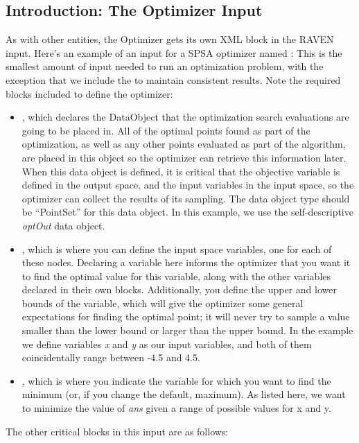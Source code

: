 \subsection{Introduction: The Optimizer Input}
As with other entities, the Optimizer gets its own XML block in the RAVEN input.
Here's an example of an input for a SPSA optimizer named :
This is the smallest amount of input needed to run an optimization problem, with the exception that we include
the  to maintain consistent results.  Note the required blocks included
to define the optimizer:
\begin{itemize}
  \item {}, which declares the DataObject that the optimization search evaluations are
    going to be placed in.  All of the optimal points found as part of the optimization, as well as any other
    points evaluated as part of the algorithm, are placed in this object so the optimizer can retrieve this
    information later.  When this data object is defined, it is critical that the objective variable is
    defined in the output space, and the input variables in the input space, so the optimizer can collect the
    results of its sampling.  The data object type should be ``PointSet'' for this data object.  In this
    example, we use the self-descriptive \emph{optOut} data object.
  \item {}, which is where you can define the input space variables, one for each of these
    nodes.  Declaring a variable here informs the optimizer that you want it to find the optimal value for
    this variable, along with the other variables declared in their own blocks.  Additionally, you define the
    upper and lower bounds of the variable, which will give the optimizer some general expectations for
    finding the optimal point; it will never try to sample a value smaller than the lower bound or larger than
    the upper bound.  In the example we define variables \emph{x} and \emph{y} as our input variables, and
    both of them coincidentally range between -4.5 and 4.5.
  \item {}, which is where you indicate the variable for which you want to find the minimum (or,
    if you change the default, maximum).  As listed here, we want to minimize the value of \emph{ans} given a
    range of possible values for {x} and {y}.
\end{itemize}
The other critical blocks in this input are as follows:

